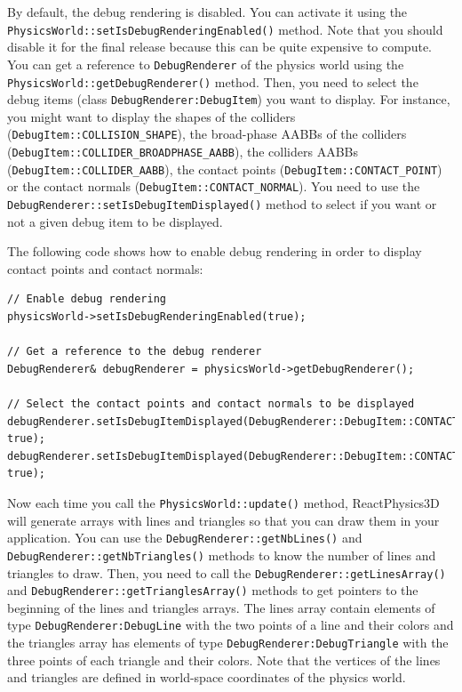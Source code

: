 \documentclass[a4paper,12pt]{article}
\begin{document}
  \begin{sloppypar}
   By default, the debug rendering is disabled. You can activate it using the \texttt{PhysicsWorld::setIsDebugRenderingEnabled()} method. Note that you
   should disable it for the final release because this can be quite expensive to compute. You can get a reference to \texttt{DebugRenderer} of the physics
   world using the \texttt{PhysicsWorld::getDebugRenderer()} method. Then, you need to select the debug items
   (class \texttt{DebugRenderer:DebugItem}) you want to display. For instance, you might want to display the shapes of the colliders
   (\texttt{DebugItem::COLLISION\_SHAPE}), the broad-phase AABBs of the colliders (\texttt{DebugItem::COLLIDER\_BROADPHASE\_AABB}), the colliders AABBs
   (\texttt{DebugItem::COLLIDER\_AABB}), the contact points (\texttt{DebugItem::CONTACT\_POINT}) or the contact normals (\texttt{DebugItem::CONTACT\_NORMAL}).
   You need to use the \texttt{DebugRenderer::setIsDebugItemDisplayed()} method to select if you want or not a given debug item to be displayed. \\
  \end{sloppypar}

  The following code shows how to enable debug rendering in order to display contact points and contact normals: \\

    \begin{lstlisting}
// Enable debug rendering
physicsWorld->setIsDebugRenderingEnabled(true);

// Get a reference to the debug renderer
DebugRenderer& debugRenderer = physicsWorld->getDebugRenderer();

// Select the contact points and contact normals to be displayed
debugRenderer.setIsDebugItemDisplayed(DebugRenderer::DebugItem::CONTACT_POINT, true);
debugRenderer.setIsDebugItemDisplayed(DebugRenderer::DebugItem::CONTACT_NORMAL, true);
    \end{lstlisting}

   \vspace{0.6cm}

  \begin{sloppypar}
    Now each time you call the \texttt{PhysicsWorld::update()} method, ReactPhysics3D will generate arrays with lines and triangles so that you can
    draw them in your application. You can use the \texttt{DebugRenderer::getNbLines()} and \texttt{DebugRenderer::getNbTriangles()} methods to know
    the number of lines and triangles to draw. Then, you need to call the \texttt{DebugRenderer::getLinesArray()} and
    \texttt{DebugRenderer::getTrianglesArray()} methods to get pointers to the beginning of the lines and triangles arrays. The lines array contain
    elements of type \texttt{DebugRenderer:DebugLine} with the two points of a line and their colors and the triangles array has elements of
    type \texttt{DebugRenderer:DebugTriangle} with the three points of each triangle and their colors. Note that the vertices of the lines and triangles
    are defined in world-space coordinates of the physics world.
  \end{sloppypar}
\end{document}
